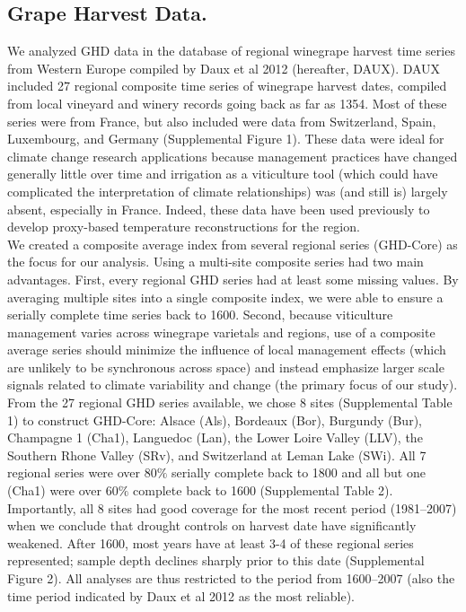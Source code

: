 \documentclass[final]{nature}
\begin{document}
\pagebreak
\begin{methods}
\subsection{Grape Harvest Data.}
\noindent We analyzed GHD data in the database of regional winegrape harvest time series from Western Europe compiled by Daux et al 2012 (hereafter, DAUX\cite{Daux2012}). DAUX included 27 regional composite time series of winegrape harvest dates, compiled from local vineyard and winery records going back as far as 1354. Most of these series were from France, but also included were data from Switzerland, Spain, Luxembourg, and Germany (Supplemental Figure 1). These data were ideal for climate change research applications because management practices have changed generally little over time and irrigation as a viticulture tool (which could have complicated the interpretation of climate relationships) was (and still is) largely absent, especially in France. Indeed, these data have been used previously to develop proxy-based temperature reconstructions for the region\cite{Daux2012}.\\
\indent We created a composite average index from several regional series (GHD-Core) as the focus for our analysis. Using a multi-site composite series had two main advantages. First, every regional GHD series had at least some missing values. By averaging multiple sites into a single composite index, we were able to ensure a serially complete time series back to 1600. Second, because viticulture management varies across winegrape varietals and regions, use of a composite average series should minimize the influence of local management effects (which are unlikely to be synchronous across space) and instead emphasize larger scale signals related to climate variability and change (the primary focus of our study).\\
\indent From the 27 regional GHD series available, we chose 8 sites (Supplemental Table 1) to construct GHD-Core: Alsace (Als), Bordeaux (Bor), Burgundy (Bur), Champagne 1 (Cha1), Languedoc (Lan), the Lower Loire Valley (LLV), the Southern Rhone Valley (SRv), and Switzerland at Leman Lake (SWi). All 7 regional series were over $80\%$ serially complete back to 1800 and all but one (Cha1) were over $60\%$ complete back to 1600 (Supplemental Table 2). Importantly, all 8 sites had good coverage for the most recent period (1981--2007) when we conclude that drought controls on harvest date have significantly weakened. After 1600, most years have at least 3-4 of these regional series represented; sample depth declines sharply prior to this date (Supplemental Figure 2). All analyses are thus restricted to the period from 1600--2007 (also the time period indicated by Daux et al 2012 as the most reliable).\\

\end{methods}
\end{document}
